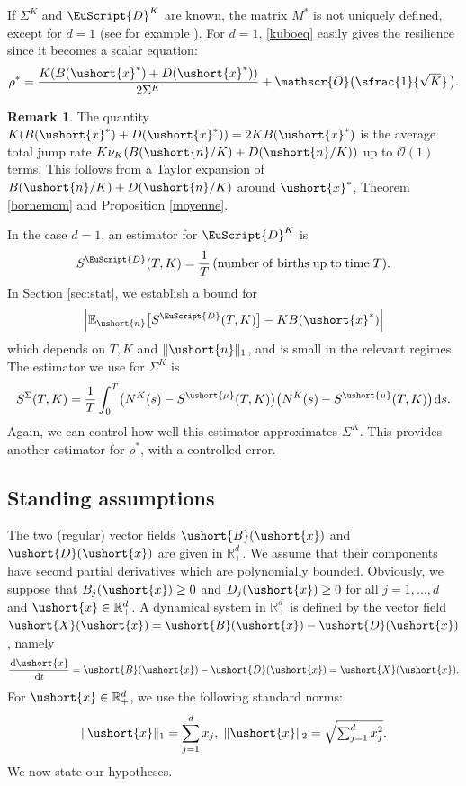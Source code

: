 \documentclass[10pt]{amsart}
\let\mathcal\mathscr
\numberwithin{equation}{section}
\theoremstyle{plain}
\theoremstyle{definition}
\newtheorem{remark}{Remark}[section]
\newcommand{\E}{{\mathbb{E}}}
\newcommand{\rpd}{\mathbb{R}_+^d}
\newcommand{\Oun}{\mathcal{O}(1)}
\newcommand{\sK}{K}
\newcommand{\vecn}{\ushort{n}}
\newcommand{\vecxf}{\ushort{x}^*}
\newcommand{\vecx}{\ushort{x}}
\newcommand{\vecX}{\ushort{X}}
\newcommand{\vecB}{\ushort{B}}
\newcommand{\vecD}{\ushort{D}}
\newcommand{\vmu}{\ushort{\mu}}
\newcommand{\res}{\rho^*}
\newcommand{\nuk}{\nu_{K}}\let\snuk\nuk
\newcommand{\dd}{\hspace{1pt}\mathrm{d}}
\newcommand{\norm}[1]{\|#1\|_{1}}\let\snorm\norm
\newcommand{\normdeux}[1]{\|#1\|_{2}}\let\snormdeux\normdeux
\begin{document}
If $\Sigma^{\sK}$ and $\EuScript{D}^{\sK}$ are known, the matrix $M^*$ is not uniquely defined, except
for $d=1$ (see for example \cite{sim}).
For $d=1$, \eqref{kuboeq} easily gives the resilience since it becomes a scalar equation:
\[
\res = \frac{K(B(\vecxf)+D(\vecxf))}{2 \Sigma^{\sK}} +\mathcal{O}\bigl(\sfrac{1}{\sqrt{K}}\,\bigr).
\]
\begin{remark}
The quantity $K(B(\vecxf)+D(\vecxf)) = 2K B(\vecxf)$ is the average total jump rate $K \nuk(B(\vecn/K) +D(\vecn/K))$ up to $\Oun$ terms.
This follows from a Taylor expansion of $B(\vecn/K) +D(\vecn/K)$ around $\vecxf$, Theorem \ref{bornemom} and Proposition \ref{moyenne}.
\end{remark}
In the case $d=1$, an estimator for $\EuScript{D}^{\sK}$ is
\begin{equation}
\label{stat-D}
S^{{\EuScript{D}}}(T,K)=\frac{1}{T}\,(\mathrm{number\; of \; births\;up\; to\; time}\;T).
\end{equation}
In Section \ref{sec:stat}, we establish a bound for
\[
\left|\E_{\vecn}\bigl[S^{{\EuScript{D}}}(T,K)\bigr]- K B(\vecxf)\right|
\]
which depends on $T, K$ and $\norm{\vecn}$, and is small in the relevant regimes.
The estimator we use for $\Sigma^{\sK}$ is
\begin{equation}
\label{stat-MSigma}
S^{\Sigma}(T,K)=
\frac{1}{T}\int_{0}^{T}\bigl(N^{\sK}(s)-S^{\vmu}(T,K)\bigr)\bigl(N^{\sK}(s)-S^{\vmu}(T,K)\bigr)\dd s.
\end{equation}
Again, we can control how well this estimator approximates $\Sigma^{\sK}$. This provides another estimator for $\rho^*$, with a controlled error.

\subsection{Standing assumptions}\label{hypo}

The two (regular) vector fields $\vecB(\vecx)$ and $\vecD(\vecx)$ are given in $\rpd$.
We assume that their components have second partial derivatives which are polynomially bounded.
Obviously, we suppose that $B_j(\vecx)\geq 0$ and $D_j(\vecx)\geq 0$ for all $j=1,\ldots,d$ and $\vecx\in\rpd$.
A dynamical system in $\rpd$ is defined by the vector field $\vecX(\vecx)=\vecB(\vecx)-\vecD(\vecx)$, namely
\[
\frac{\dd \vecx}{\dd t}=\vecB(\vecx)-\vecD(\vecx)=\vecX(\vecx).
\]
For $\vecx\in \rpd$, we use the following standard norms:
\[
\norm{\vecx}=\sum_{j=1}^{d}x_{j}, \;
\normdeux{\vecx}=\sqrt{\textstyle\sum_{j=1}^{d} x_{j}^2}.
\]
We now state our hypotheses.
\end{document}
